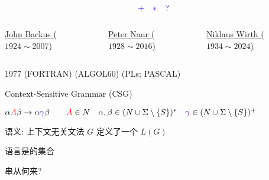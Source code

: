 \begin{frame}{}
\end{frame}

\begin{frame}{}
  \begin{center}
    \href{https://en.wikipedia.org/wiki/Extended\_Backus\%E2\%80\%93Naur\_form}{}
    \[
      \textcolor{blue}{+ \quad \ast \quad ?}
    \]
  \end{center}

  \begin{columns}
      \begin{center}
        \href{https://en.wikipedia.org/wiki/John_Backus}{John Backus ($1924 \sim 2007$)}
      \end{center}
      \begin{center}
        \href{https://en.wikipedia.org/wiki/Peter_Naur}{Peter Naur ($1928 \sim 2016$)}
      \end{center}
      \begin{center}
        \href{https://en.wikipedia.org/wiki/Niklaus_Wirth}{Niklaus Wirth ($1934 \sim 2024$)}
      \end{center}
  \end{columns}

  \pause
  \begin{center}
    1977 (FORTRAN)  (ALGOL60)  (PLs; PASCAL)
  \end{center}
\end{frame}

\begin{frame}{}
  \begin{center}
    Context-Sensitive Grammar (CSG)
    

    $\alpha \textcolor{red}{A} \beta \to \alpha \textcolor{blue}{\gamma} \beta
      \qquad \textcolor{red}{A} \in N \quad \alpha, \beta \in (N \cup \Sigma \setminus \{S\})^{\ast}
        \quad \textcolor{blue}{\gamma} \in (N \cup \Sigma \setminus \{S\})^{+}$
  \end{center}
\end{frame}

\begin{frame}{}
  \begin{center}
    语义: 上下文无关文法 $G$ 定义了一个 $L(G)$

    \pause
    \vspace{0.50cm}
    语言是的集合

    \vspace{0.30cm}
    串从何来?
  \end{center}
\end{frame}

